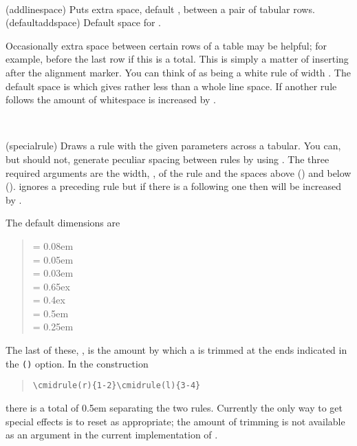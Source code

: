 \begin{syntax}
\cmd{\addlinespace}
 \\
\end{syntax}
\glossary(addlinespace)%
  {}%
  {Puts extra space, default , between a pair of tabular
   rows.}
\glossary(defaultaddspace)%
  {}%
  {Default space for .}


 Occasionally extra space between certain rows of a table may be helpful; 
for example, before the last row if this is a total.
This is simply a matter of inserting \cmd{\addlinespace}
 after the \cmd{\\} alignment marker.
You can think
 of \cmd{\addlinespace} as being a white rule of width .
 The default space is  which gives rather
 less than a whole line space. If another rule follows 
the amount of whitespace is increased by \lnc{\doublerulesep}.

\begin{syntax}
\cmd{\specialrule} \\
\end{syntax}
\glossary(specialrule)%
  {}%
  {Draws a rule with the given parameters across a tabular.}
    You can, but should not, generate peculiar spacing between
rules by using \cmd{\specialrule}. The three required arguments are the
width, , of the rule and the spaces above ()
and below (). \cmd{\specialrule} ignores a preceding rule
but if there is a following one then 
will be increased by \lnc{\doublerulesep}.

 The default dimensions are
 \begin{quote}
   \lnc{\heavyrulewidth} = 0.08em \\
   \lnc{\lightrulewidth} = 0.05em \\
   \lnc{\cmidrulewidth}  = 0.03em \\
   \lnc{\belowrulesep}   = 0.65ex \\
   \lnc{\aboverulesep}   = 0.4ex \\
    = 0.5em \\
   \lnc{\cmidrulekern}   = 0.25em
 \end{quote}
 The last of these, \lnc{\cmidrulekern}, is the amount by which a
 \cmd{\cmidrule} is trimmed at the ends indicated in the \verb?()?
 option. In the construction
 \begin{quote}
   \verb?\cmidrule(r){1-2}\cmidrule(l){3-4}?
 \end{quote}
 there is a total of 0.5em separating the two rules. Currently
 the only way to get special effects is to reset \lnc{\cmidrulekern}
 as appropriate; the amount of trimming is not available as an
 argument in the current implementation of \cmd{\cmidrule}.


